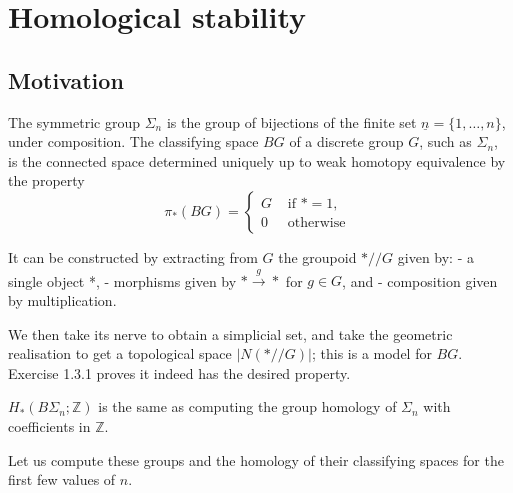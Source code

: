 
\part{Homological stability}
\chapter{Motivation}


\cite{kupersHomologicalStabilityMinicourse2021}

The symmetric group $\Sigma_n$ is the group of bijections of the finite set $\underline{n}=\{1, \ldots, n\}$, under composition. The classifying space $B G$ of a discrete group $G$, such as $\Sigma_n$, is the connected space determined uniquely up to weak homotopy equivalence by the property
$$
\pi_*(B G)= \begin{cases}G & \text { if } *=1, \\ 0 & \text { otherwise }\end{cases}
$$

It can be constructed by extracting from $G$ the groupoid $* / / G$ given by:
- a single object *,
- morphisms given by $* \xrightarrow{g} *$ for $g \in G$, and
- composition given by multiplication.

We then take its nerve to obtain a simplicial set, and take the geometric realisation to get a topological space $|N(* / / G)|$; this is a model for $B G$. Exercise 1.3.1 proves it indeed has the desired property.



\begin{prop}
    $H_*\left(B \Sigma_n ; \mathbb{Z}\right)$  is the same as computing the group homology of $\Sigma_n$ with coefficients in $\mathbb{Z}$.
\end{prop}
Let us compute these groups and the homology of their classifying spaces for the first few values of $n$.


